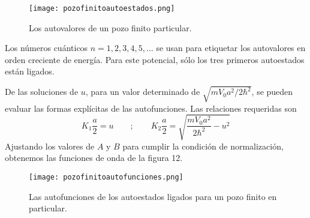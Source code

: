 \documentclass[12pt,a4paper]{article}
\begin{document}
\begin{figure}[ht!]
\begin{center}
\texttt{[image: pozofinitoautoestados.png]}
\caption{Los autovalores de un pozo finito particular.}
\end{center}
\end{figure}

Los números cuánticos $n=1,2,3,4,5,\ldots$ se usan para etiquetar los autovalores en orden creciente de energía. Para este potencial, sólo los tres primeros autoestados están ligados.

De las soluciones de $u$, para un valor determinado de $\sqrt{mV_{0}a^{2}/2\hbar^{2}}$, se pueden evaluar las formas explícitas de las autofunciones. Las relaciones requeridas son
\[ K_{1} \frac{a}{2}=u \qquad ; \qquad K_{2} \frac{a}{2}=\sqrt{\frac{mV_{0}a^{2}}{2\hbar^{2}}-u^{2}} \]
Ajustando los valores de $A$ y $B$ para cumplir la condición de normalización, obtenemos las funciones de onda de la figura 12.

\begin{figure}[ht!]
\begin{center}
\texttt{[image: pozofinitoautofunciones.png]}
\caption{Las autofunciones de los autoestados ligados para un pozo finito en particular.}
\end{center}
\end{figure}
\end{document}
